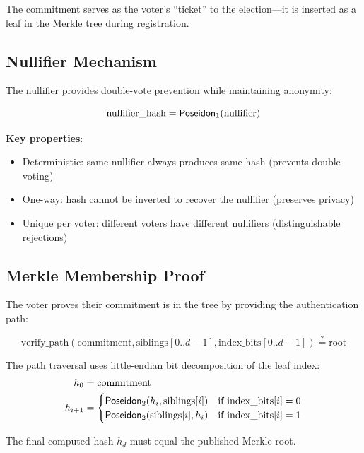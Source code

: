 The commitment serves as the voter's ``ticket'' to the election---it is inserted as a leaf in the Merkle tree during registration.

\subsection{Nullifier Mechanism}

The nullifier provides double-vote prevention while maintaining anonymity:

\begin{equation}
\text{nullifier\_hash} = \mathsf{Poseidon}_1(\text{nullifier})
\end{equation}

\textbf{Key properties}:
\begin{itemize}
    \item Deterministic: same nullifier always produces same hash (prevents double-voting)
    \item One-way: hash cannot be inverted to recover the nullifier (preserves privacy)
    \item Unique per voter: different voters have different nullifiers (distinguishable rejections)
\end{itemize}

\subsection{Merkle Membership Proof}

The voter proves their commitment is in the tree by providing the authentication path:

\begin{equation}
\text{verify\_path}(\text{commitment}, \text{siblings}[0..d-1], \text{index\_bits}[0..d-1]) \stackrel{?}{=} \text{root}
\end{equation}

The path traversal uses little-endian bit decomposition of the leaf index:
\begin{align}
h_0 &= \text{commitment} \\
h_{i+1} &= \begin{cases}
\mathsf{Poseidon}_2(h_i, \text{siblings}[i]) & \text{if } \text{index\_bits}[i] = 0 \\
\mathsf{Poseidon}_2(\text{siblings}[i], h_i) & \text{if } \text{index\_bits}[i] = 1
\end{cases}
\end{align}

The final computed hash $h_d$ must equal the published Merkle root.

